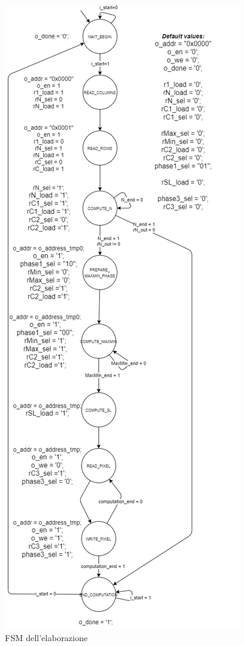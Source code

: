 \documentclass[11pt]{article} %
\begin{document}
\begin{figure}[h]
\centering
\includegraphics[scale=0.2995]{../datapaths/FSM-vertical.png}
\caption{FSM dell'elaborazione}
\end{figure}
\end{document}
